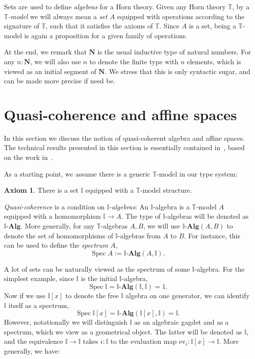 \documentclass[12pt]{amsart}
\theoremstyle{definition}
\newtheorem*{axiom}{Axiom}
\newcommand{\mb}[1]{\mathbf{#1}}
\newcommand{\mbb}[1]{\mathbb{#1}}
\newcommand{\T}{\mbb T}
\newcommand{\I}{\mbb I}
\newcommand{\alg}{\text{-}\mb{Alg}}
\newcommand{\ev}{\mathrm{ev}}
\newcommand{\N}{\mb N}
\newcommand{\spec}{\operatorname{Spec}}
\begin{document}
Sets are used to define \emph{algebras} for a Horn theory. Given any Horn theory $\T$, by a \emph{$\T$-model} we will always mean a \emph{set} $A$ equipped with operations according to the signature of $\T$, such that it satisfies the axioms of $\T$. Since $A$ is a set, being a $\T$-model is again a proposition for a given family of operations.

At the end, we remark that $\N$ is the usual inductive type of natural numbers. For any $n:\N$, we will also use $n$ to denote the finite type with $n$ elements, which is viewed as an initial segment of $\N$. We stress that this is only syntactic sugar, and can be made more precise if need be.

\section{Quasi-coherence and affine spaces}

In this section we discuss the notion of quasi-coherent algebra and affine spaces. The technical results presented in this section is essentially contained in~\cite{Cherubini_Coquand_Hutzler_2024}, based on the work in~\cite{blechschmidt2021using}. 

As a starting point, we assume there is a generic $\T$-model in our type system:

\begin{axiom}
  There is a set $\I$ equipped with a $\T$-model structure.
\end{axiom}

\emph{Quasi-coherence} is a condition on \emph{$\I$-algebras}: An $\I$-algebra is a $\T$-model $A$ equipped with a homomorphism $\I \to A$. The type of $\I$-algebras will be denoted as $\I\alg$. More generally, for any $\T$-algebras $A,B$, we will use $\I\alg(A,B)$ to denote the set of homomorphisms of $\I$-algebras from $A$ to $B$. For instance, this can be used to define the \emph{spectrum} $A$,
\[ \spec A := \I\alg(A,\I). \]

A lot of sets can be naturally viewed as the spectrum of some $\I$-algebra. For the simplest example, since $\I$ is the initial $\I$-algebra,
\[ \spec \I = \I\alg(\I,\I) = 1. \]
Now if we use $\I[x]$ to denote the free $\I$ algebra on one generator, we can identify $\I$ itself as a spectrum,
\[ \spec \I[x] = \I\alg(\I[x],\I) = \I. \]
However, notationally we will distinguish $\I$ as an algebraic gagdet and as a spectrum, which we view as a geometrical object. The latter will be denoted as $\I$, and the equivalence $\I \to \I$ takes $i : \I$ to the evaluation map $\ev_i : \I[x] \to \I$. More generally, we have:
\end{document}
